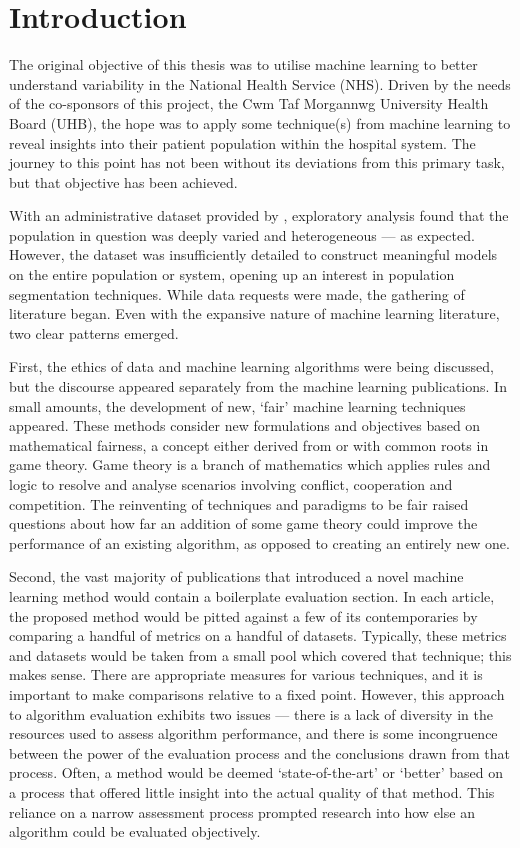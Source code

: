 \chapter{Introduction}
\label{chp:intro}

The original objective of this thesis was to utilise machine learning to
better understand variability in the National Health Service (NHS). Driven by
the needs of the co-sponsors of this project, the Cwm Taf Morgannwg University
Health Board (UHB), the hope was to apply some technique(s) from machine
learning to reveal insights into their patient population within the hospital
system. The journey to this point has not been without its deviations from this
primary task, but that objective has been achieved.

With an administrative dataset provided by \ctmuhb, exploratory analysis found
that the population in question was deeply varied and heterogeneous --- as
expected. However, the dataset was insufficiently detailed to construct
meaningful models on the entire population or system, opening up an interest in
population segmentation techniques. While data requests were made, the gathering
of literature began. Even with the expansive nature of machine learning
literature, two clear patterns emerged.

First, the ethics of data and machine learning algorithms were being discussed,
but the discourse appeared separately from the machine learning publications. In
small amounts, the development of new, `fair' machine learning techniques
appeared. These methods consider new formulations and objectives based on
mathematical fairness, a concept either derived from or with common roots in
game theory. Game theory is a branch of mathematics which applies rules and
logic to resolve and analyse scenarios involving conflict, cooperation and
competition. The reinventing of techniques and paradigms to be fair raised
questions about how far an addition of some game theory could improve the
performance of an existing algorithm, as opposed to creating an entirely new
one.

Second, the vast majority of publications that introduced a novel machine
learning method would contain a boilerplate evaluation section. In each article,
the proposed method would be pitted against a few of its contemporaries by
comparing a handful of metrics on a handful of datasets. Typically, these
metrics and datasets would be taken from a small pool which covered that
technique; this makes sense. There are appropriate measures for various
techniques, and it is important to make comparisons relative to a fixed point.
However, this approach to algorithm evaluation exhibits two issues --- there is
a lack of diversity in the resources used to assess algorithm performance, and
there is some incongruence between the power of the evaluation process and the
conclusions drawn from that process. Often, a method would be deemed
`state-of-the-art' or `better' based on a process that offered little insight
into the actual quality of that method. This reliance on a narrow assessment
process prompted research into how else an algorithm could be evaluated
objectively.


